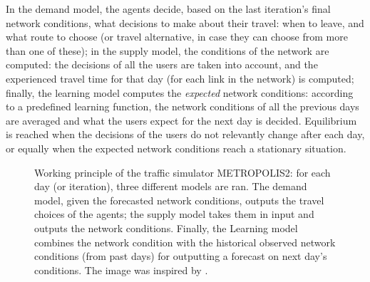In the demand model, the agents decide,
based on the last iteration's final network conditions,
what decisions to make about their travel:
when to leave, and what route to choose (or travel alternative, in case they can choose from more than one of these);
in the supply model, the conditions of the network are computed:
the decisions of all the users are taken into account, and the experienced travel time for that day
(for each link in the network) is computed;
finally, the learning model computes the \textit{expected} network conditions:
according to a predefined learning function,
the network conditions of all the previous days are averaged and what the users expect for the next day is decided.
Equilibrium is reached when the decisions of the users do not relevantly change after each day,
or equally when the expected network conditions reach a stationary situation.
\begin{figure}
  \centering
  \caption{Working principle of the traffic simulator METROPOLIS2:
    for each day (or iteration), three different models are ran.
    The demand model, given the forecasted network conditions, outputs the travel choices of the agents;
    the supply model takes them in input and outputs the network conditions.
    Finally, the Learning model combines the network condition with the historical observed network conditions (from past days) for outputting a forecast on next day's conditions.
  The image was inspired by \textcite{RePEc:ema:worpap:2024-03}.}
  \label{fig:metr_func}
\end{figure}

